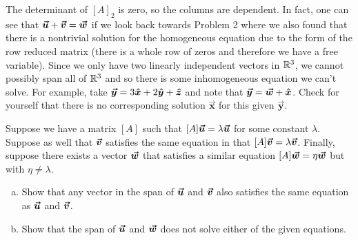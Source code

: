 \documentclass[12pt]{article} %
\newcommand{\vecx}{\boldsymbol{\vec{x}}}
\newcommand{\vecy}{\boldsymbol{\vec{y}}}
\begin{document}
\begin{solution}
The determinant of $[A]_2$ is zero, so the columns are dependent. In fact, one can see that $\boldsymbol{\boldsymbol{\vec{u}}}+\boldsymbol{\boldsymbol{\vec{v}}} = \boldsymbol{\boldsymbol{\vec{w}}}$ if we look back towards Problem 2 where we also found that there is a nontrivial solution for the homogeneous equation due to the form of the row reduced matrix (there is a whole row of zeros and therefore we have a free variable).  Since we only have two linearly independent vectors in $\mathbb{R}^3$, we cannot possibly span all of $\mathbb{R}^3$ and so there is some inhomogeneous equation we can't solve.  For example, take $\vecy=3\xhat +2\yhat+\zhat$ and note that $\vecy = \vecw + \xhat$.  Check for yourself that there is no corresponding solution $\vecx$ for this given $\vecy$.
\end{solution}

\newpage
\begin{problem}
Suppose we have a matrix $[A]$ such that $[A]\boldsymbol{\boldsymbol{\vec{u}}} = \lambda \boldsymbol{\boldsymbol{\vec{u}}}$ for some constant $\lambda$.  Suppose as well that $\boldsymbol{\boldsymbol{\vec{v}}}$ satisfies the same equation in that $[A]\boldsymbol{\boldsymbol{\vec{v}}} = \lambda \boldsymbol{\boldsymbol{\vec{v}}}$.  Finally, suppose there exists a vector $\boldsymbol{\boldsymbol{\vec{w}}}$ that satisfies a similar equation $[A]\boldsymbol{\boldsymbol{\vec{w}}} = \eta \boldsymbol{\boldsymbol{\vec{w}}}$ but with $\eta\neq \lambda$.
\begin{enumerate}[(a)]
    \item Show that any vector in the span of $\boldsymbol{\boldsymbol{\vec{u}}}$ and $\boldsymbol{\boldsymbol{\vec{v}}}$ also satisfies the same equation as $\boldsymbol{\boldsymbol{\vec{u}}}$ and $\boldsymbol{\boldsymbol{\vec{v}}}$.
    \item Show that the span of $\boldsymbol{\boldsymbol{\vec{u}}}$ and $\boldsymbol{\boldsymbol{\vec{w}}}$ does not solve either of the given equations.
\end{enumerate}
\end{problem}
\end{document}
